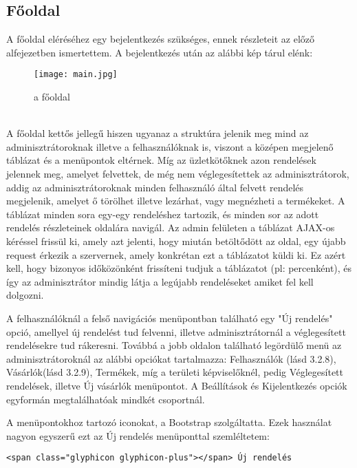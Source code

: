 \subsection{Főoldal}
A főoldal eléréséhez egy bejelentkezés szükséges, ennek részleteit az előző alfejezetben ismertettem. A bejelentkezés után az alábbi kép tárul elénk:
\begin{figure}[h]
    \centering
    \texttt{[image: main.jpg]}
    \caption{a főoldal}
\end{figure}
\\
A főoldal kettős jellegű hiszen ugyanaz a struktúra jelenik meg mind az adminisztrátoroknak illetve a felhasználóknak is, viszont a középen megjelenő táblázat és a menüpontok eltérnek. Míg az üzletkötőknek azon rendelések jelennek meg, amelyet felvettek, de még nem véglegesítettek az adminisztrátorok, addig az adminisztrátoroknak minden felhasználó által felvett rendelés megjelenik, amelyet ő törölhet illetve lezárhat, vagy megnézheti a termékeket. A táblázat minden sora egy-egy rendeléshez tartozik, és minden sor az adott rendelés részleteinek oldalára navigál. Az admin felületen a táblázat AJAX-os kéréssel frissül ki, amely azt jelenti, hogy miután betöltődött az oldal, egy újabb request érkezik a szervernek, amely konkrétan ezt a táblázatot küldi ki. Ez azért kell, hogy bizonyos időközönként frissíteni tudjuk a táblázatot (pl: percenként), és így az adminisztrátor mindig látja a legújabb rendeléseket amiket fel kell dolgozni.

A felhasználóknál a felső navigációs menüpontban található egy "Új rendelés" opció, amellyel új rendelést tud felvenni, illetve adminisztrátornál a véglegesített rendelésekre tud rákeresni. Továbbá a jobb oldalon található legördülő menü az adminisztrátoroknál az alábbi opciókat tartalmazza: Felhasználók (lásd 3.2.8), Vásárlók(lásd 3.2.9), Termékek, míg a területi képviselőknél, pedig Véglegesített rendelések, illetve Új vásárlók menüpontot. A Beállítások és Kijelentkezés opciók egyformán megtalálhatóak mindkét csoportnál.

A menüpontokhoz tartozó iconokat, a Bootstrap szolgáltatta. Ezek használat nagyon egyszerű ezt az Új rendelés menüponttal szemléltetem: 
\begin{verbatim}
<span class="glyphicon glyphicon-plus"></span> Új rendelés
\end{verbatim}

